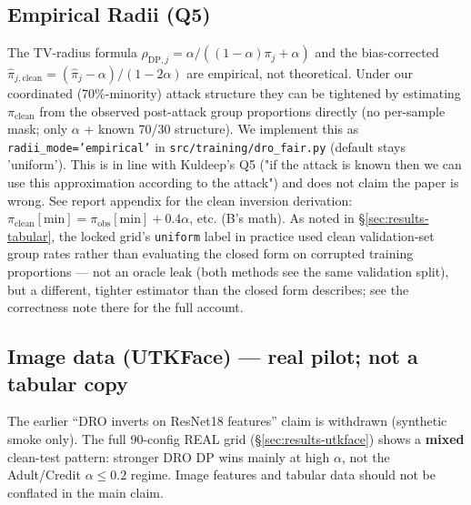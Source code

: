 \subsection{Empirical Radii (Q5)}
The TV-radius formula
$\rho_{\mathrm{DP},j}=\alpha/((1-\alpha)\pi_j+\alpha)$ and the
bias-corrected $\hat\pi_{j,\mathrm{clean}}=(\hat\pi_j-\alpha)/(1-2\alpha)$
are empirical, not theoretical.  Under our coordinated (70\%-minority)
attack structure they can be tightened by estimating $\pi_{\mathrm{clean}}$
from the observed post-attack group proportions directly (no per-sample mask; only $\alpha$ + known 70/30 structure).  We
implement this as \texttt{radii\_mode='empirical'} in
\texttt{src/training/dro\_fair.py} (default stays 'uniform').  This
is in line with Kuldeep's Q5 ("if the attack is known then we can
use this approximation according to the attack") and does not claim
the paper is wrong.
See report appendix for the clean inversion derivation: $\pi_{\mathrm{clean}}[\mathrm{min}] = \pi_{\mathrm{obs}}[\mathrm{min}] + 0.4\alpha$, etc. (B's math).
As noted in \S\ref{sec:results-tabular}, the locked grid's
\texttt{uniform} label in practice used clean validation-set group rates
rather than evaluating the closed form on corrupted training proportions
--- not an oracle leak (both methods see the same validation split), but
a different, tighter estimator than the closed form describes; see the
correctness note there for the full account.

\subsection{Image data (UTKFace) --- real pilot; not a tabular copy}
The earlier ``DRO inverts on ResNet18 features'' claim is withdrawn
(synthetic smoke only).  The full 90-config REAL grid
(\S\ref{sec:results-utkface}) shows a \textbf{mixed} clean-test pattern:
stronger DRO DP wins mainly at high $\alpha$, not the Adult/Credit
$\alpha\le0.2$ regime.  Image features and tabular data should not be
conflated in the main claim.

